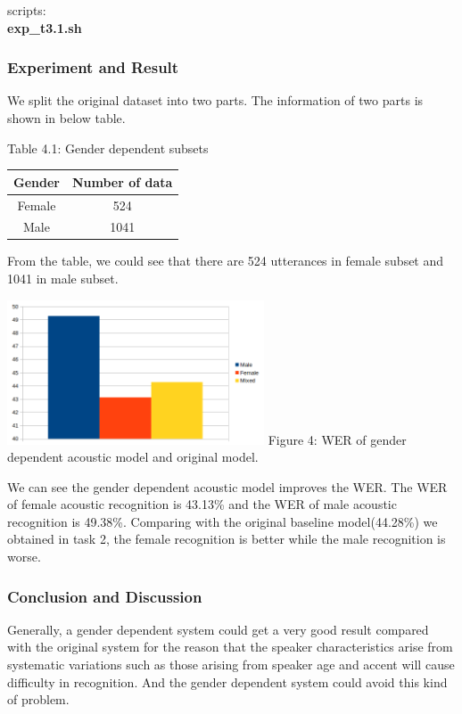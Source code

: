 \documentclass[]{article}
\begin{document}
\begin{multicols*}{2}
scripts: \textbf{\\ \indent exp\_t3.1.sh}

\subsubsection{Experiment and Result}
We split the original dataset into two parts. The information of two parts is shown in below table.

\begin{center}
Table 4.1: Gender dependent subsets

\begin{tabular}{c c}
\toprule
Gender & Number of data  \\
\midrule
Female & 524 \\
Male & 1041 \\
\bottomrule
\end{tabular}
\end{center}

From the table, we could see that there are 524 utterances in female subset and 1041 in male subset.

\begin{center}
\includegraphics[width=3in]{plot.png} %
Figure 4: WER of gender dependent acoustic model and original model.
\end{center}

We can see the gender dependent acoustic model improves the WER. The WER of female acoustic  recognition is 43.13\% and the WER of male acoustic recognition is 49.38\%. Comparing with the original baseline model(44.28\%) we obtained in task 2, the female recognition is better while the male recognition is worse.

\subsubsection{Conclusion and Discussion}
Generally, a gender dependent system could get a very good result compared with the original system for the reason that the speaker characteristics arise from systematic variations such as those arising from speaker age and accent will cause difficulty in recognition. And the gender dependent system could avoid this kind of problem.


\end{multicols*}
\end{document}
